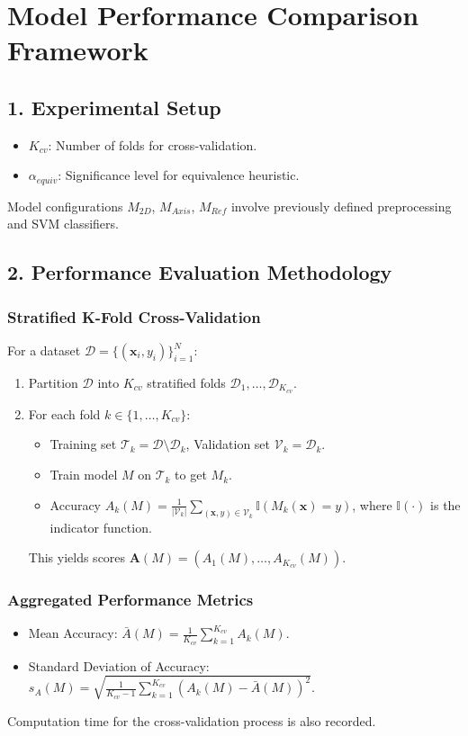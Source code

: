 \documentclass{article}
\newcommand{\vecbf}[1]{\bm{#1}} %
\newcommand{\set}[1]{\mathcal{#1}} %
\begin{document}
\section*{Model Performance Comparison Framework}

\subsection*{1. Experimental Setup}
\begin{itemize}
    \item $K_{cv}$: Number of folds for cross-validation.
    \item $\alpha_{equiv}$: Significance level for equivalence heuristic.
\end{itemize}
Model configurations $M_{2D}$, $M_{Axis}$, $M_{Ref}$ involve previously defined preprocessing and SVM classifiers.

\subsection*{2. Performance Evaluation Methodology}
\subsubsection*{Stratified K-Fold Cross-Validation}
For a dataset $\set{D} = \{(\vecbf{x}_i, y_i)\}_{i=1}^N$:
\begin{enumerate}
    \item Partition $\set{D}$ into $K_{cv}$ stratified folds $\set{D}_1, \dots, \set{D}_{K_{cv}}$.
    \item For each fold $k \in \{1, \dots, K_{cv}\}$:
    \begin{itemize}
        \item Training set $\set{T}_k = \set{D} \setminus \set{D}_k$, Validation set $\set{V}_k = \set{D}_k$.
        \item Train model $M$ on $\set{T}_k$ to get $M_k$.
        \item Accuracy $A_k(M) = \frac{1}{|\set{V}_k|} \sum_{(\vecbf{x},y) \in \set{V}_k} \mathbb{I}(M_k(\vecbf{x}) = y)$, where $\mathbb{I}(\cdot)$ is the indicator function.
    \end{itemize}
    This yields scores $\vecbf{A}(M) = (A_1(M), \dots, A_{K_{cv}}(M))$.
\end{enumerate}

\subsubsection*{Aggregated Performance Metrics}
\begin{itemize}
    \item Mean Accuracy: $\bar{A}(M) = \frac{1}{K_{cv}} \sum_{k=1}^{K_{cv}} A_k(M)$.
    \item Standard Deviation of Accuracy: $s_A(M) = \sqrt{\frac{1}{K_{cv}-1} \sum_{k=1}^{K_{cv}} (A_k(M) - \bar{A}(M))^2}$.
\end{itemize}
Computation time for the cross-validation process is also recorded.
\end{document}
